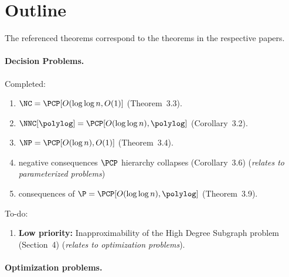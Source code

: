 \section{Outline}

The referenced theorems correspond to the theorems in the respective papers.

\paragraph{Decision Problems.}
Completed:
\begin{enumerate}
\item $\NC = \PCP[O(\log \log n, O(1)]$ (Theorem~3.3).
\item $\NNC[\polylog] = \PCP[O(\log \log n), \polylog]$ (Corollary~3.2).
\item $\NP = \PCP[O(\log n), O(1)]$ (Theorem~3.4).
\item negative consequences $\PCP$ hierarchy collapses (Corollary~3.6) (\emph{relates to parameterized problems})
\item consequences of $\P = \PCP[O(\log \log n), \polylog]$ (Theorem~3.9).
\end{enumerate}
To-do:
\begin{enumerate}
\item \textbf{Low priority:} Inapproximability of the High Degree Subgraph problem (Section~4) (\emph{relates to optimization problems}).
\end{enumerate}

\paragraph{Optimization problems.}

